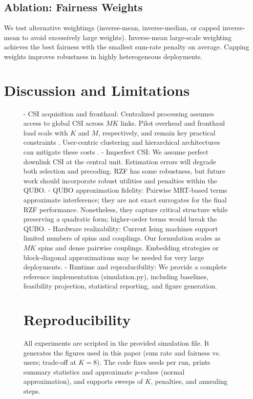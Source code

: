 {\subsection{Ablation: Fairness Weights}
We test alternative weightings (inverse-mean, inverse-median, or capped inverse-mean to avoid excessively large weights). Inverse-mean large-scale weighting achieves the best fairness with the smallest sum-rate penalty on average. Capping weights improves robustness in highly heterogeneous deployments.

\section{Discussion and Limitations}
\begin{figure}[htbp]
- CSI acquisition and fronthaul: Centralized processing assumes access to global CSI across $MK$ links. Pilot overhead and fronthaul load scale with $K$ and $M$, respectively, and remain key practical constraints \cite{bjornson2016massive,demir2021foundations}. User-centric clustering and hierarchical architectures can mitigate these costs \cite{chen2020structured}.
- Imperfect CSI: We assume perfect downlink CSI at the central unit. Estimation errors will degrade both selection and precoding. RZF has some robustness, but future work should incorporate robust utilities and penalties within the QUBO.
- QUBO approximation fidelity: Pairwise MRT-based terms approximate interference; they are not exact surrogates for the final RZF performance. Nonetheless, they capture critical structure while preserving a quadratic form; higher-order terms would break the QUBO.
- Hardware realizability: Current Ising machines support limited numbers of spins and couplings. Our formulation scales as $MK$ spins and dense pairwise couplings. Embedding strategies or block-diagonal approximations may be needed for very large deployments.
- Runtime and reproducibility: We provide a complete reference implementation (simulation.py), including baselines, feasibility projection, statistical reporting, and figure generation.

\section{Reproducibility}
All experiments are scripted in the provided simulation file. It generates the figures used in this paper (sum rate and fairness vs. users; trade-off at $K=8$). The code fixes seeds per run, prints summary statistics and approximate $p$-values (normal approximation), and supports sweeps of $K$, penalties, and annealing steps.


\end{figure}}

